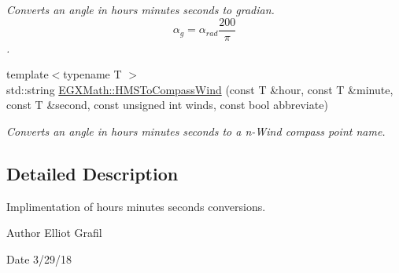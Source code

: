 \begin{DoxyCompactItemize}
\begin{DoxyCompactList}\small\item\em Converts an angle in hours minutes seconds to gradian. \[\alpha_{g}=\alpha_{rad}\frac{200}{\pi}\]. \end{DoxyCompactList}\item 
{\footnotesize template$<$typename T $>$ }\\std\+::string \mbox{\hyperlink{group___e_g_x_math-_conversions-_angle_conversions-_h_m_s_ga6374888f82360747241f6670e1b2048e}{E\+G\+X\+Math\+::\+H\+M\+S\+To\+Compass\+Wind}} (const T \&hour, const T \&minute, const T \&second, const unsigned int winds, const bool abbreviate)
\begin{DoxyCompactList}\small\item\em Converts an angle in hours minutes seconds to a n-\/\+Wind compass point name. \end{DoxyCompactList}\end{DoxyCompactItemize}


\subsection{Detailed Description}
Implimentation of hours minutes seconds conversions. 

\begin{DoxyAuthor}{Author}
Elliot Grafil 
\end{DoxyAuthor}
\begin{DoxyDate}{Date}
3/29/18 
\end{DoxyDate}
